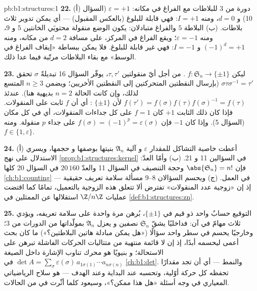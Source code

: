 \begin{solution}{pb:b1:structures:1}
\textbf{22.} (أ) دورة من  $3$ للبلاطات مع الفراغ في مكانه:
$\varepsilon = +1$ (السؤال 10) و $d = 0$، ومنه $I = +1$: فهي قابلة للبلوغ
(بالعكس المقبول) --- أي يمكن تدوير ثلاث بلاطات.
(ب) البلاطة $5$ والفراغ متبادلان: يكون الوضع
منقولة محتويَي الخانتين $5$ و $9$، ومنه
$\varepsilon = -1$؛ ويقع الفراغ في المركز، على مسافة
$d = 2$ من مكانه، ومنه $(-1)^d = +1$ و $I = -1$:
فهي غير قابلة للبلوغ. فلا يمكن ببساطة «إيقاف الفراغ في الوسط»
مع بقاء البلاطات مرتّبة فيما عدا ذلك.

\textbf{23.} ليكن $f \colon \mathfrak S_n \to \{\pm1\}$ . من أجل
أيّ منقولتين $\tau, \tau'$، يوفّر السؤال 16
تبديلةً $\sigma$ تحقق $\sigma\tau\sigma^{-1} = \tau'$ (بإرسال
النقطتين المتحركتين إلى النقطتين الأخريين؛ ويضمن $n \geq 3$ المتسع
لذلك، وإن كانت الحالة $n = 2$ بديهية هنا). عندئذ $f(\tau') =
f(\sigma)f(\tau)f(\sigma)^{-1} = f(\tau)$ لأن $\{\pm1\}$
: أي أن $f$ ثابت على المنقولات. فإذا كان ذلك الثابت
$+1$ كان $f = 1$ على كل جداءات المنقولات، أي
في كل مكان (السؤال 5). وإذا كان $-1$ فإن $f(\sigma) =
(-1)^p = \varepsilon(\sigma)$ على جداء $p$ منقولة.
ومنه $f \in \{1, \varepsilon\}$.

\textbf{24.} (أ) أعطت خاصية التشاكل للمقدار $\varepsilon$ و
آلية   $\mathfrak A_n$ بنيتها بوصفها  و
حجمها، ويسري الاستدلال على نهج \cref{prop:b1:structures:kernel}
في السؤالين 11 و 21. (ب) وأمّا العدّ: فإن $\abs{\mathfrak S_n} = n!$ وحجة التنصيف في السؤال 11
والعدّ $20\,160$ في السؤال 20 كلها
\cref{ch:b1:counting} في العمل. (ج) ويحسم السؤالان 8--9 مسألة
سلامة تعريف حقيقية --- إذ إن  «زوجية عدد
المنقولات» تفترض ألا تتعلق هذه الزوجية
بالتعميل، تمامًا كما اقتضت عمليات $\Z/n\Z$
استقلالها عن الممثلين في \cref{def:b1:structures:zn}.

\textbf{25.} التوقيع حسابٌ واحد ذو قيم في $\{\pm1\}$،
بُرهن مرة واحدة على سلامة تعريفه، ويؤدي ثلاث
مهامّ في آن: فداخليًا يشقّ $\mathfrak S_n$ نصفين و
يعزل $\mathfrak A_n$ بمولّداتها من الدورات من  $3$؛
وخارجيًا يحسم في سطر واحد سؤالًا («هل يمكن مبادلة هاتين
البلاطتين؟») ما كان بحث أعمى ليحسمه أبدًا، إذ إن
لا قائمة منتهية من متتاليات الحركات الفاشلة تبرهن على الاستحالة؛ و
بنيويًا هو محرك تناوب الإشارة داخل
الصيغة $\det A = \sum_\sigma \varepsilon(\sigma)\,
a_{1\sigma(1)}\cdots a_{n\sigma(n)}$ في \cref{ch:b1:det}. والنمط
--- أي أن تجد مقدارًا تحفظه كل حركة أوّلية، وتحسبه
عند البداية وعند الهدف --- هو سلاح
الرياضياتي المعياري في وجه أسئلة «هل هذا ممكن؟»،
وسيعود كلما أثّرت  في  من الحالات.
\end{solution}
